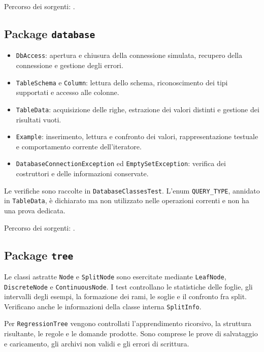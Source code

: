 \documentclass[11pt,a4paper]{article}
\begin{document}
Percorso dei sorgenti: .

\subsection*{Package \texttt{database}}

\begin{itemize}
  \item \texttt{DbAccess}: apertura e chiusura della connessione simulata,
        recupero della connessione e gestione degli errori.
  \item \texttt{TableSchema} e \texttt{Column}: lettura dello schema,
        riconoscimento dei tipi supportati e accesso alle colonne.
  \item \texttt{TableData}: acquisizione delle righe, estrazione dei valori
        distinti e gestione dei risultati vuoti.
  \item \texttt{Example}: inserimento, lettura e confronto dei valori,
        rappresentazione testuale e comportamento corrente dell'iteratore.
  \item \texttt{DatabaseConnectionException} ed \texttt{EmptySetException}:
        verifica dei costruttori e delle informazioni conservate.
\end{itemize}

Le verifiche sono raccolte in \texttt{DatabaseClassesTest}.
L'enum \texttt{QUERY\_TYPE}, annidato in \texttt{TableData}, è dichiarato ma
non utilizzato nelle operazioni correnti e non ha una prova dedicata.

Percorso dei sorgenti: .

\clearpage
\subsection*{Package \texttt{tree}}

Le classi astratte \texttt{Node} e \texttt{SplitNode} sono esercitate mediante
\texttt{LeafNode}, \texttt{DiscreteNode} e \texttt{ContinuousNode}.
I test controllano le statistiche delle foglie, gli intervalli degli esempi,
la formazione dei rami, le soglie e il confronto fra split. Verificano anche
le informazioni della classe interna \texttt{SplitInfo}.

Per \texttt{RegressionTree} vengono controllati l'apprendimento ricorsivo, la
struttura risultante, le regole e le domande prodotte. Sono comprese le prove di
salvataggio e caricamento, gli archivi non validi e gli errori di scrittura.
\end{document}
